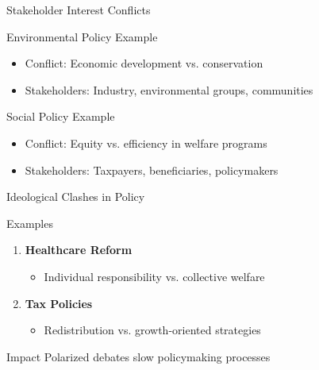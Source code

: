 \documentclass[10pt]{beamer}
\begin{document}
\begin{frame}{Stakeholder Interest Conflicts}
    \begin{block}{Environmental Policy Example}
        \begin{itemize}
            \item Conflict: Economic development vs. conservation
            \item Stakeholders: Industry, environmental groups, communities
        \end{itemize}
    \end{block}
    
    \begin{block}{Social Policy Example}
        \begin{itemize}
            \item Conflict: Equity vs. efficiency in welfare programs
            \item Stakeholders: Taxpayers, beneficiaries, policymakers
        \end{itemize}
    \end{block}
\end{frame}

\begin{frame}{Ideological Clashes in Policy}
    \begin{block}{Examples}
        \begin{enumerate}
            \item \textbf{Healthcare Reform}
            \begin{itemize}
                \item Individual responsibility vs. collective welfare
            \end{itemize}
            
            \item \textbf{Tax Policies}
            \begin{itemize}
                \item Redistribution vs. growth-oriented strategies
            \end{itemize}
        \end{enumerate}
    \end{block}
    
    \begin{alertblock}{Impact}
        Polarized debates slow policymaking processes
    \end{alertblock}
\end{frame}
\end{document}
